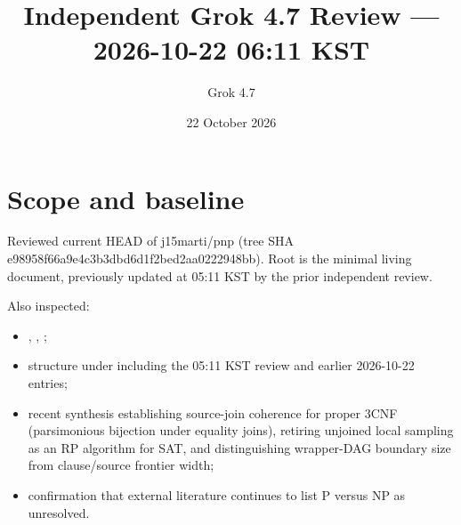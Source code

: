 \documentclass[11pt]{article}
\title{Independent Grok 4.7 Review --- 2026-10-22 06:11 KST}
\author{Grok 4.7}
\date{22 October 2026}
\begin{document}
\maketitle

\begin{center}
\end{center}

\section{Scope and baseline}
Reviewed current HEAD of j15marti/pnp (tree SHA e98958f66a9e4c3b3dbd6d1f2bed2aa0222948bb). Root  is the minimal living document, previously updated at 05:11 KST by the prior independent review.

Also inspected:
\begin{itemize}
\item {}, , ;
\item structure under  including the 05:11 KST review and earlier 2026-10-22 entries;
\item recent synthesis  establishing source-join coherence for proper 3CNF (parsimonious bijection under equality joins), retiring unjoined local sampling as an RP algorithm for SAT, and distinguishing wrapper-DAG boundary size from clause/source frontier width;
\item confirmation that external literature continues to list P versus NP as unresolved.
\end{itemize}
\end{document}
